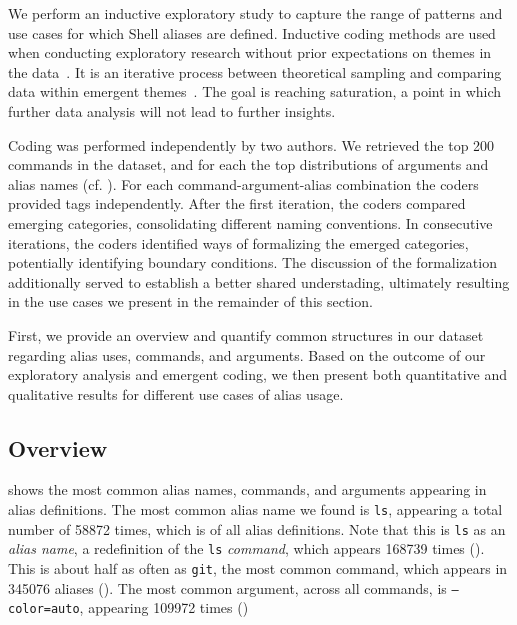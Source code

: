 We perform an inductive exploratory study to capture the range of patterns and use cases for which Shell aliases are defined. 
Inductive coding methods are used when conducting exploratory research without prior expectations on themes in the data~\cite{thomas:06}. It is an iterative process between theoretical sampling and comparing data within emergent themes~\cite{dey:03}. The goal is reaching saturation, a point in which further data analysis will not lead to further insights. 

Coding was performed independently by two authors.
We retrieved the top 200 commands in the dataset, and for each the top distributions of arguments and alias names (cf. ).
For each command-argument-alias combination the coders provided tags independently.
After the first iteration, the coders compared emerging categories, consolidating different naming conventions.
In consecutive iterations, the coders identified ways of formalizing the emerged categories, potentially identifying boundary conditions.
The discussion of the formalization additionally served to establish a better shared understading, ultimately resulting in the use cases we present in the remainder of this section.

First, we provide an overview and quantify common structures in our dataset regarding alias uses, commands, and arguments.
Based on the outcome of our exploratory analysis and emergent coding, we then present both quantitative and qualitative results for different use cases of alias usage.

\subsection{Overview}

 shows the most common alias names, commands, and arguments appearing in alias definitions.
The most common alias name we found is \texttt{ls}, appearing a total number of \num{58872} times, which is  of all alias definitions.
Note that this is \texttt{ls} as an \emph{alias name}, a redefinition of the \texttt{ls} \emph{command}, which appears \num{168739} times ().
This is about half as often as \texttt{git}, the most common command, which appears in \num{345076} aliases ().
The most common argument, across all commands, is \texttt{--color=auto}, appearing \num{109972} times ()




